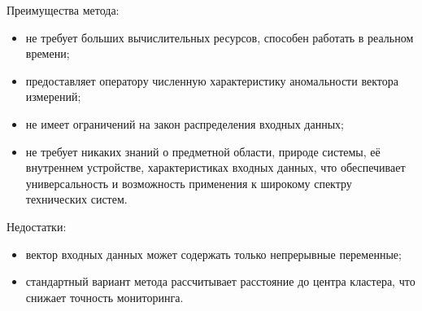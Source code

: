 Преимущества метода:
\begin{itemize}
	\item не требует больших вычислительных ресурсов, способен работать в реальном времени;
	\item предоставляет оператору численную характеристику аномальности вектора измерений;
	\item не имеет ограничений на закон распределения входных данных;
	\item не требует никаких знаний о предметной области, природе системы, её внутреннем устройстве, характеристиках входных данных, что обеспечивает универсальность и возможность применения к широкому спектру технических систем.
\end{itemize}

Недостатки:
\begin{itemize}
	\item вектор входных данных может содержать только непрерывные переменные;
	\item стандартный вариант метода рассчитывает расстояние до центра кластера, что снижает точность мониторинга.
\end{itemize}